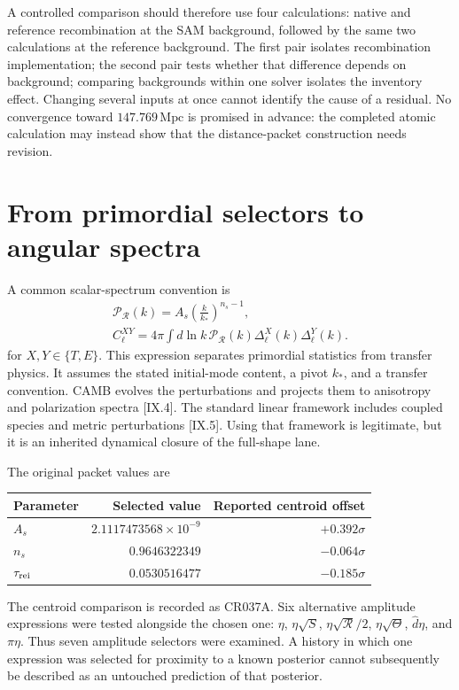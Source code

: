 A controlled comparison should therefore use four calculations: native and reference recombination at the SAM background, followed by the same two calculations at the reference background. The first pair isolates recombination implementation; the second pair tests whether that difference depends on background; comparing backgrounds within one solver isolates the inventory effect. Changing several inputs at once cannot identify the cause of a residual. No convergence toward $147.769\,\mathrm{Mpc}$ is promised in advance: the completed atomic calculation may instead show that the distance-packet construction needs revision.

\section{From primordial selectors to angular spectra}

A common scalar-spectrum convention is
\begin{equation}
 \begin{gathered}
 \mathcal P_{\mathcal R}(k)=A_s\left(\frac{k}{k_*}\right)^{n_s-1},\\
 C_\ell^{XY}=4\pi\int d\ln k\,
 \mathcal P_{\mathcal R}(k)\Delta_\ell^X(k)\Delta_\ell^Y(k).
 \end{gathered}
 \label{c9:transfer}
\end{equation}
for $X,Y\in\{T,E\}$. This expression separates primordial statistics from transfer physics. It assumes the stated initial-mode content, a pivot $k_*$, and a transfer convention. CAMB evolves the perturbations and projects them to anisotropy and polarization spectra [IX.4]. The standard linear framework includes coupled species and metric perturbations [IX.5]. Using that framework is legitimate, but it is an inherited dynamical closure of the full-shape lane.

The original packet values are
\begin{center}
\small\setlength{\tabcolsep}{3pt}
\begin{tabular}{@{}lrr@{}}
\toprule
Parameter & Selected value & Reported centroid offset\\
\midrule
$A_s$ &$2.1117473568\times10^{-9}$&$+0.392\sigma$\\
$n_s$ &$0.9646322349$&$-0.064\sigma$\\
$\tau_{\rm rei}$ &$0.0530516477$&$-0.185\sigma$\\
\bottomrule
\end{tabular}
\end{center}
The centroid comparison is recorded as CR037A. Six alternative amplitude expressions were tested alongside the chosen one: $\eta$, $\eta\sqrt S$, $\eta\sqrt{\mathcal R}/2$, $\eta\sqrt\Theta$, $\widehat d\eta$, and $\pi\eta$. Thus seven amplitude selectors were examined. A history in which one expression was selected for proximity to a known posterior cannot subsequently be described as an untouched prediction of that posterior.

